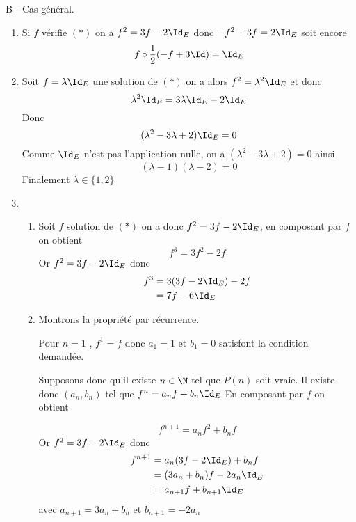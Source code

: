 \documentclass[a4paper, 11pt,reqno]{article}
\begin{document}
\begin{correction}
\begin{enumerate}
\end{enumerate}
B - Cas général. 
\begin{enumerate}
\item Si $f$ vérifie $(*)$ on a 
$f^2 = 3f- 2\Id_E$ donc $-f^2+3f =2\Id_E$ soit encore 
$$f\circ \frac{1}{2}(-f +3\Id) = \Id_E$$

\item Soit $f =\lambda \Id_E$ une solution de $(*)$ on a alors 
$f^2 = \lambda^2 \Id_E$   et donc 
$$\lambda^2 \Id_E = 3\lambda  \Id_E - 2\Id_E$$
Donc $$(\lambda^2 - 3\lambda +2) \Id_E =0$$
Comme $\Id_E$ n'est pas l'application nulle, on a $(\lambda^2 - 3\lambda +2)=0$ ainsi 
$$(\lambda -1) (\lambda -2) =0$$
 Finalement $\lambda \in \{1,2\}$
 
 
 \item \begin{enumerate}
 \item Soit $f$ solution   de $(*)$ on a donc $f^2 =3f-2\Id_E$, en composant par $f$ on obtient 
 $$f^3 =3f^2 -2f$$
 Or $f^2 =3f-2\Id_E$ donc 
\begin{align*}
f^3 &= 3 (3f-2\Id_E) -2f \\
		&= 7f -6\Id_E
\end{align*}


\item Montrons la propriété par récurrence. 

Pour $n=1$ ,  $f^1 =f$ donc $a_1 =1 $ et $b_1 =0$ satisfont la condition demandée. 

Supposons donc qu'il existe $n\in \N$ tel que $P(n) $ soit vraie. Il existe donc $(a_n,b_n)$ tel que 
$f^n =a_n f +b_n \Id_E$
En composant par $f$ on obtient 

$$f^{n+1} =a_n f^2 +b_n f$$
 Or $f^2 =3f-2\Id_E$ donc 
\begin{align*}
f^{n+1}  &= a_n (3f-2\Id_E) +b_nf  \\
		&= (3a_n +b_n) f -2a_n\Id_E\\
		&=a_{n+1} f +b_{n+1}\Id_E\\
\end{align*}
avec $a_{n+1} = 3a_n +b_n$ et $b_{n+1} = -2a_n$







\end{enumerate}
\end{enumerate}
\end{correction}
\end{document}
